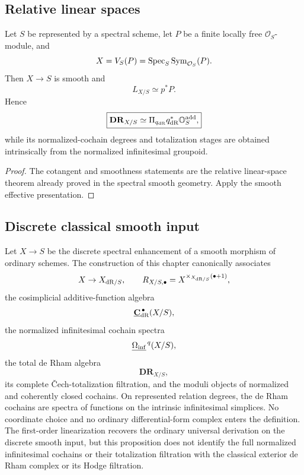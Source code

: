 \subsection{Relative linear spaces}

\begin{proposition}
\label{prop:monadic-de-rham-linear-space}
Let \(S\) be represented by a spectral scheme, let \(P\) be a finite locally free
\(\mathcal O_S\)-module, and
\[
    X=V_S(P)=\operatorname{Spec}_S\operatorname{Sym}_{\mathcal O_S}(P).
\]
Then \(X\to S\) is smooth and
\[
    L_{X/S}\simeq p^*P.
\]
Hence
\[
\boxed{
    \mathbf{DR}_{X/S}
    \simeq
    \Pi_{q_{\mathrm{dR}}}q_{\mathrm{dR}}^*\mathbb O_S^{\mathrm{add}},
}
\]
while its normalized-cochain degrees and totalization stages are obtained intrinsically from the normalized infinitesimal
groupoid.
\end{proposition}

\begin{proof}
The cotangent and smoothness statements are the relative linear-space theorem already proved in the
spectral smooth geometry.  Apply the smooth effective presentation.
\end{proof}

\subsection{Discrete classical smooth input}

\begin{proposition}
\label{prop:monadic-de-rham-classical-smooth}
Let \(X\to S\) be the discrete spectral enhancement of a smooth morphism of ordinary schemes.  The
construction of this chapter canonically associates
\[
    X\to X_{\mathrm{dR}/S},
    \qquad
    R_{X/S,\bullet}
    =
    X^{\times_{X_{\mathrm{dR}/S}}(\bullet+1)},
\]
the cosimplicial additive-function algebra
\[
    \underline{\mathbf C}_{\mathrm{dR}}^{\,\bullet}(X/S),
\]
the normalized infinitesimal cochain spectra
\[
    \underline{\Omega_{\mathrm{inf}}}^{\,q}(X/S),
\]
the total de Rham algebra
\[
    \mathbf{DR}_{X/S},
\]
its complete \v{C}ech-totalization filtration, and the moduli objects of normalized and coherently closed cochains.  On
represented relation degrees, the de Rham cochains are spectra of functions on the intrinsic
infinitesimal simplices.  No coordinate choice and no ordinary differential-form complex enters the
definition.  The first-order linearization recovers the ordinary universal derivation on the discrete smooth
input, but this proposition does not identify the full normalized infinitesimal cochains or their
totalization filtration with the classical exterior de Rham complex or its Hodge filtration.
\end{proposition}

